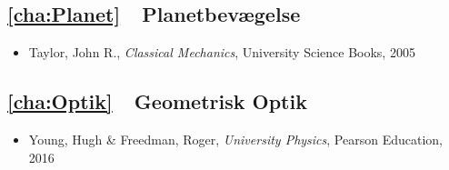 \subsection*{\ref{cha:Planet}~~Planetbevægelse}
\begin{itemize}
\item Taylor, John R., \textit{Classical Mechanics}, University Science Books, 2005
\end{itemize}
\subsection*{\ref{cha:Optik}~~Geometrisk Optik}
\begin{itemize}
\item Young, Hugh \& Freedman, Roger, \textit{University Physics}, Pearson Education, 2016
\end{itemize}
